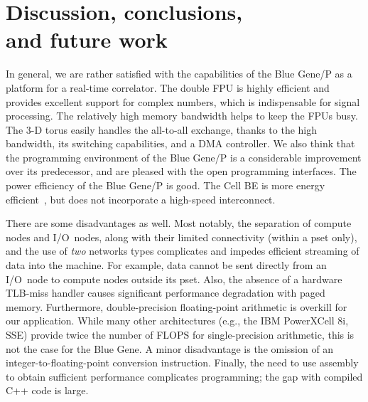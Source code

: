 \documentclass{sig-alternate}
\begin{document}



\section{Discussion, conclusions, \\ and future work}
\label{sec:conclusions}

In general, we are rather satisfied with the capabilities of the Blue Gene/P
as a platform for a real-time correlator.
The double FPU is highly efficient and provides excellent support for complex
numbers, which is indispensable for signal processing.
The relatively high memory bandwidth helps to keep the FPUs busy.
The 3-D torus easily handles the all-to-all exchange, thanks to the high
bandwidth, its switching capabilities, and a DMA controller.
We also think that the programming environment of the Blue Gene/P is a
considerable improvement over its predecessor,
and are pleased with the open programming interfaces.
The power efficiency of the Blue Gene/P is good.
The Cell BE is more energy efficient~\cite{Nieuwpoort:09}, but does not
incorporate a high-speed interconnect.

There are some disadvantages as well.
Most notably, the separation of compute nodes and I/O~nodes, along with their
limited connectivity (within a pset only), and the use of \emph{two\/}
networks types complicates and impedes efficient streaming of data into the
machine.
For example, data cannot be sent directly from an I/O~node to 
compute nodes outside its pset.
Also, the absence of a hardware TLB-miss handler causes significant
performance degradation with paged memory.
Furthermore, double-precision floating-point arithmetic is overkill for our
application.
While many other architectures (e.g., the IBM PowerXCell 8i, SSE) provide twice
the number of FLOPS for single-precision arithmetic, this is not the case for
the Blue Gene.
A minor disadvantage is the omission of an integer-to-floating-point conversion
instruction.
Finally, the need to use assembly to obtain sufficient performance complicates
programming; the gap with compiled C++ code is large.
\end{document}
